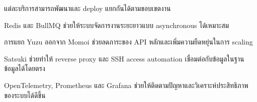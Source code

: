 \begin{mycustomenum2}
    \item แต่ละบริการสามารถพัฒนาและ deploy แยกกันได้ตามขอบเขตงาน
    \item Redis และ BullMQ ช่วยให้ระบบจัดการงานระยะยาวแบบ asynchronous ได้เหมาะสม
    \item การแยก Yuzu ออกจาก Momoi ช่วยลดภาระของ API หลักและเพิ่มความยืดหยุ่นในการ scaling
    \item Satsuki ช่วยทำให้ reverse proxy และ SSH access automation เชื่อมต่อกับข้อมูลในฐานข้อมูลได้โดยตรง
    \item OpenTelemetry, Prometheus และ Grafana ช่วยให้ติดตามปัญหาและวิเคราะห์ประสิทธิภาพของระบบได้ดีขึ้น
\end{mycustomenum2}
